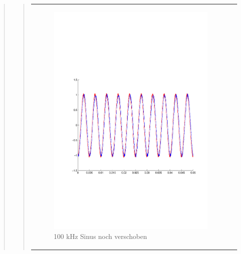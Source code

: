 \begin{quote}
\begin{quote}
\begin{center}
\begin{tabular}{ll}
            \hspace{-5cm}
                \begin{minipage}{0.6\textwidth}
                    \begin{figure}[H]
                        \includegraphics[scale=0.55, trim = 16mm 70mm 16mm 85mm, clip]{Bilder/100kHz_sin_Signal_Rekonstuiert}
                          \caption{100 kHz Sinus noch verschoben}
		                  \label{fig:100kHz_sin_rek}
                    \end{figure}
                \end{minipage}
                

\end{tabular}
\end{center}
\end{quote}
\end{quote}
